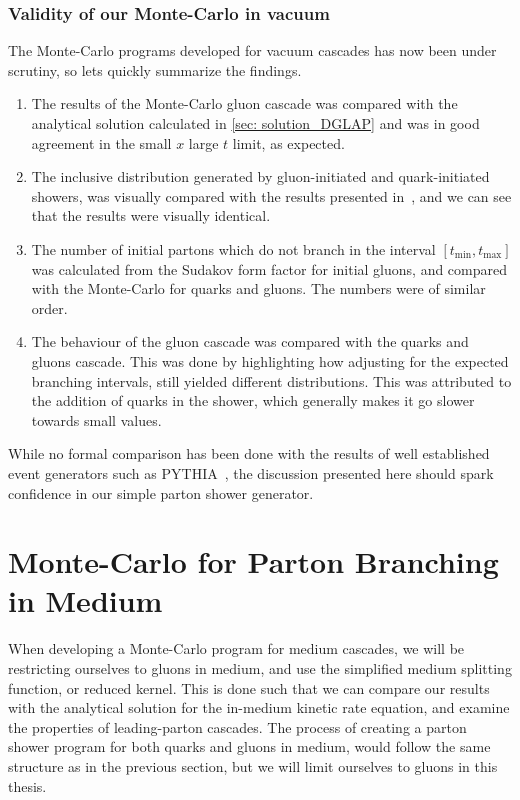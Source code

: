 \documentclass[main.tex]{subfiles}
\begin{document}
\subsubsection*{Validity of our Monte-Carlo in vacuum}
The Monte-Carlo programs developed for vacuum cascades has now been under scrutiny, so lets quickly summarize the findings. 
\begin{enumerate}
    \item The results of the Monte-Carlo gluon cascade was compared with the analytical solution calculated in \autoref{sec: solution_DGLAP} and was in good agreement in the small \(x\) large \(t\) limit, as expected. 
    \item The inclusive distribution generated by gluon-initiated and quark-initiated showers, was visually compared with the results presented in~\cite{Dasgupta_2015}, and we can see that the results were visually identical.
    \item The number of initial partons which do not branch in the interval \([t_{\text{min}}, t_{\text{max}}]\) was calculated from the Sudakov form factor for initial gluons, and compared with the Monte-Carlo for quarks and gluons. The numbers were of similar order.
    \item The behaviour of the gluon cascade was compared with the quarks and gluons cascade. This was done by highlighting how adjusting for the expected branching intervals, still yielded different distributions. This was attributed to the addition of quarks in the shower, which generally makes it go slower towards small values.
\end{enumerate}
While no formal comparison has been done with the results of well established event generators such as PYTHIA~\cite{PYTHIA_Bierlich:2022pfr}, the discussion presented here should spark confidence in our simple parton shower generator.
 

\clearpage
\section{Monte-Carlo for Parton Branching in Medium}
When developing a Monte-Carlo program for medium cascades, we will be restricting ourselves to gluons in medium, and use the simplified medium splitting function, or reduced kernel. This is done such that we can compare our results with the analytical solution for the in-medium kinetic rate equation, and examine the properties of leading-parton cascades. The process of creating a parton shower program for both quarks and gluons in medium, would follow the same structure as in the previous section, but we will limit ourselves to gluons in this thesis.
\end{document}
